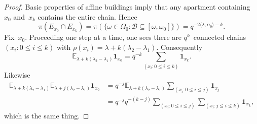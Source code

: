 \documentclass[a4paper]{amsart}
\newcommand{\sprod}[2]{{\langle #1, #2\rangle}}
\newcommand{\ind}[1]{{\mathbf{1}_{{#1}}}}
\newcommand{\seq}[2]{\left({#1}: {#2}\right)}
\newcommand{\EE}{\mathbb{E}}
\theoremstyle{plain}
\theoremstyle{definition}
\theoremstyle{remark}
\numberwithin{equation}{section}
\theoremstyle{plain}
\begin{document}
\begin{proof}
  Basic properties of affine buildings imply that any apartment
  containing~$x_0$ and~$x_k$ contains the entire chain. Hence
  \begin{equation*}
    \pi(E_{x_0}\cap E_{x_k})
    =\pi(\{\omega\in\Omega_0 : 
     \mathscr{B}\subseteq[\omega,\omega_0]\})
    =q^{-2\sprod{\lambda}{\alpha_0}-k} .
  \end{equation*}
  Fix~$x_0$.  Proceeding one step at a time, one sees there are
  $q^k$~connected chains $\seq{x_i}{0\leq i\leq k}$ with
  $\rho(x_i)=\lambda+k(\lambda_2-\lambda_1)$.  Consequently
  \begin{equation*}
    \EE_{\lambda+k(\lambda_2-\lambda_1)}\ind{x_0}
      =q^{-k}\sum_{\seq{x_i}{0\leq i\leq k}}
      \ind{x_k}.
  \end{equation*}
  Likewise
  \begin{align*}
    \EE_{\lambda+k(\lambda_2-\lambda_1)}
    \EE_{\lambda+j(\lambda_2-\lambda_1)}\ind{x_0}
    & =q^{-j}\EE_{\lambda+k(\lambda_2-\lambda_1)}\sum_{\seq{x_i}{0\leq i\leq j}}
      \ind{x_j} \\
    & =q^{-j}q^{-(k-j)}\sum_{\seq{x_i}{0\leq i\leq j}}
     \sum_{\seq{x_i}{j\leq i\leq k}}
     \ind{x_k},
  \end{align*}
  which is the same thing.
\end{proof}
\end{document}
